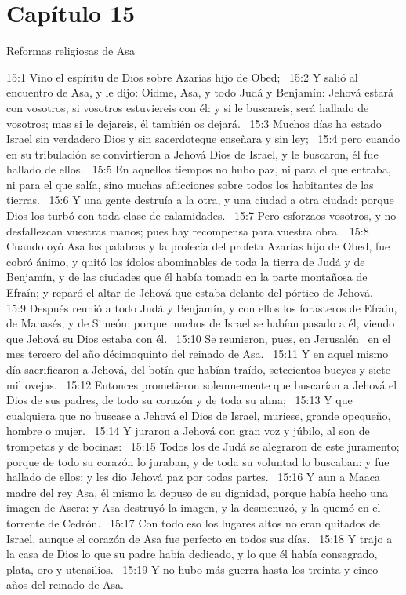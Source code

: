 \section*{Capítulo 15 }
Reformas religiosas de Asa   

15:1 Vino el espíritu de Dios sobre Azarías hijo de Obed;  
15:2 Y salió al encuentro de Asa, y le dijo: Oidme, Asa, y todo Judá y Benjamín: Jehová estará con vosotros, si vosotros estuviereis con él: y si le buscareis, será hallado de vosotros; mas si le dejareis, él también os dejará.  
15:3 Muchos días ha estado Israel sin verdadero Dios y sin sacerdoteque enseñara y sin ley;  
															15:4 pero cuando en su tribulación se convirtieron a Jehová Dios de Israel, y le buscaron, él fue hallado de ellos.  
															15:5 En aquellos tiempos no hubo paz, ni para el que entraba, ni para el que salía, sino muchas aflicciones sobre todos los habitantes de las tierras.  
															15:6 Y una gente destruía a la otra, y una ciudad a otra ciudad: porque Dios los turbó con toda clase de calamidades.  
															15:7 Pero esforzaos vosotros, y no desfallezcan vuestras manos; pues hay recompensa para vuestra obra.  
															15:8 Cuando oyó Asa las palabras y la profecía del profeta Azarías hijo de Obed, fue cobró ánimo, y quitó los ídolos abominables de toda la tierra de Judá y de Benjamín, y de las ciudades que él había tomado en la parte montañosa de Efraín; y reparó el altar de Jehová que estaba delante del pórtico de Jehová.  
															15:9 Después reunió a todo Judá y Benjamín, y con ellos los forasteros de Efraín, de Manasés, y de Simeón: porque muchos de Israel se habían pasado a él, viendo que Jehová su Dios estaba con él.  
															15:10 Se reunieron, pues, en Jerusalén  en el mes tercero del año décimoquinto del reinado de Asa.  
															15:11 Y en aquel mismo día sacrificaron a Jehová, del botín que habían traído, setecientos bueyes y siete mil ovejas.  
															15:12 Entonces prometieron solemnemente que buscarían a Jehová el Dios de sus padres, de todo su corazón y de toda su alma;  
															15:13 Y que cualquiera que no buscase a Jehová el Dios de Israel, muriese, grande opequeño, hombre o mujer.  
															15:14 Y juraron a Jehová con gran voz y júbilo, al son de trompetas y de bocinas:  
															15:15 Todos los de Judá se alegraron de este juramento; porque de todo su corazón lo juraban, y de toda su voluntad lo buscaban: y fue hallado de ellos; y les dio Jehová paz por todas partes.  
															15:16 Y aun a Maaca madre del rey Asa, él mismo la depuso de su dignidad, porque había hecho una imagen de Asera: y Asa destruyó la imagen, y la desmenuzó, y la quemó en el torrente de Cedrón.  
															15:17 Con todo eso los lugares altos no eran quitados de Israel, aunque el corazón de Asa fue perfecto en todos sus días.  
															15:18 Y trajo a la casa de Dios lo que su padre había dedicado, y lo que él había consagrado, plata, oro y utensilios.  
															15:19 Y no hubo más guerra hasta los treinta y cinco años del reinado de Asa.  
